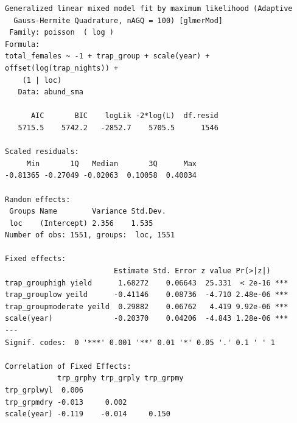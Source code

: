 \documentclass[
  letterpaper,
]{krantz}
\newenvironment{Shaded}{\begin{snugshade}}{\end{snugshade}}
\newcommand{\AttributeTok}[1]{\textcolor[rgb]{0.13,0.29,0.53}{#1}}
\newcommand{\CommentTok}[1]{\textcolor[rgb]{0.56,0.35,0.01}{\textit{#1}}}
\newcommand{\DecValTok}[1]{\textcolor[rgb]{0.00,0.00,0.81}{#1}}
\newcommand{\FunctionTok}[1]{\textcolor[rgb]{0.13,0.29,0.53}{\textbf{#1}}}
\newcommand{\NormalTok}[1]{#1}
\newcommand{\OtherTok}[1]{\textcolor[rgb]{0.56,0.35,0.01}{#1}}
\newcommand{\SpecialCharTok}[1]{\textcolor[rgb]{0.81,0.36,0.00}{\textbf{#1}}}
\begin{document}
\begin{Shaded}
\end{Shaded}

\begin{verbatim}
Generalized linear mixed model fit by maximum likelihood (Adaptive
  Gauss-Hermite Quadrature, nAGQ = 100) [glmerMod]
 Family: poisson  ( log )
Formula: 
total_females ~ -1 + trap_group + scale(year) + offset(log(trap_nights)) +  
    (1 | loc)
   Data: abund_sma

      AIC       BIC    logLik -2*log(L)  df.resid 
   5715.5    5742.2   -2852.7    5705.5      1546 

Scaled residuals: 
     Min       1Q   Median       3Q      Max 
-0.81365 -0.27049 -0.02063  0.10058  0.40034 

Random effects:
 Groups Name        Variance Std.Dev.
 loc    (Intercept) 2.356    1.535   
Number of obs: 1551, groups:  loc, 1551

Fixed effects:
                         Estimate Std. Error z value Pr(>|z|)    
trap_grouphigh yield      1.68272    0.06643  25.331  < 2e-16 ***
trap_grouplow yeild      -0.41146    0.08736  -4.710 2.48e-06 ***
trap_groupmoderate yeild  0.29882    0.06762   4.419 9.92e-06 ***
scale(year)              -0.20370    0.04206  -4.843 1.28e-06 ***
---
Signif. codes:  0 '***' 0.001 '**' 0.01 '*' 0.05 '.' 0.1 ' ' 1

Correlation of Fixed Effects:
            trp_grphy trp_grply trp_grpmy
trp_grplwyl  0.006                       
trp_grpmdry -0.013     0.002             
scale(year) -0.119    -0.014     0.150   
\end{verbatim}
\end{document}
